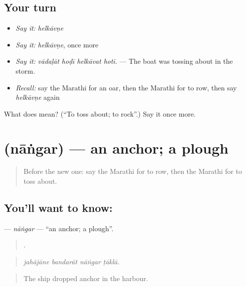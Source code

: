 \subsection*{Your turn}
\begin{itemize}
\raggedright
  \item \emph{Say it:} \emph{helkāvṇe}
  \item \emph{Say it:} \emph{helkāvṇe}, once more
  \item \emph{Say it:} \emph{vādaḷāt hoḍī helkāvat hotī.} — The boat was tossing about in the storm.
  \item \emph{Recall:} say the Marathi for an oar, then the Marathi for to row, then say \emph{helkāvṇe} again
\end{itemize}

\begin{tcolorbox}[breakable,colback=teal!4,colframe=teal!35!black,title={Before you move on}]
What does  mean? (\textquotedblleft{}To toss about; to rock\textquotedblright{}.) Say it once more.
\end{tcolorbox}
\section[\texorpdfstring{\mr{नांगर} (nāṅgar)}{नांगर (nāṅgar)}]{ (nāṅgar) — an anchor; a plough}

\label{lesson:MR-C408-nangar}



\begin{quote}
Before the new one: say the Marathi for to row, then the Marathi for to toss about.
\end{quote}

\subsection*{You'll want to know: }
\textbf{} — \emph{nāṅgar} — \textquotedblleft{}an anchor; a plough\textquotedblright{}.

\begin{quote}
   .
\end{quote}

\begin{quote}
\emph{jahājāne bandarāt nāṅgar ṭāklā.}
\end{quote}

\begin{quote}
The ship dropped anchor in the harbour.
\end{quote}

